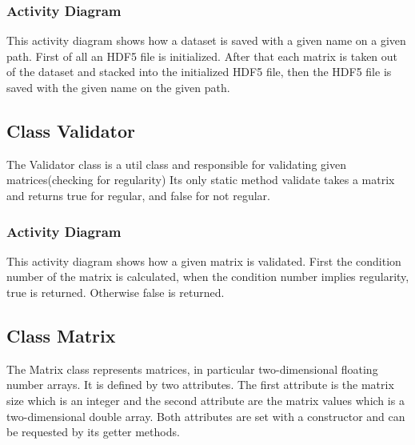 \documentclass[parskip=full]{scrartcl}
\begin{document}
\subsubsection{Activity Diagram}
\newpage
\begin{figure}[h]
\begin{center}

\label{Activity Diagrams}
\end{center}
\end{figure}
\newpage
This activity diagram shows how a dataset is saved with a given name on a given path. First of all an \gls{HDF5} file is initialized.
After that each matrix is taken out of the dataset and stacked into the initialized \gls{HDF5} file, then the \gls{HDF5} file is saved with the given name on the given path.
\subsection{Class Validator}
The Validator class is a util class and responsible for validating given matrices(checking for regularity)
Its only static method validate takes a matrix and returns true for regular, and false for not regular.
\subsubsection{Activity Diagram}
\newpage
\begin{figure}[h]
\begin{center}

\label{Activity Diagrams}
\end{center}
\end{figure}
\newpage

This activity diagram shows how a given matrix is validated.
First the condition number of the matrix is calculated, when the condition number implies regularity, true is returned. Otherwise false is returned.

\subsection{Class Matrix}
The Matrix class represents matrices, in particular two-dimensional floating number arrays.
It is defined by two attributes.
The first attribute is the matrix size which is an integer and the second attribute are the matrix values which is a two-dimensional double array.
Both attributes are set with a constructor and can be requested by its getter methods.
\end{document}
